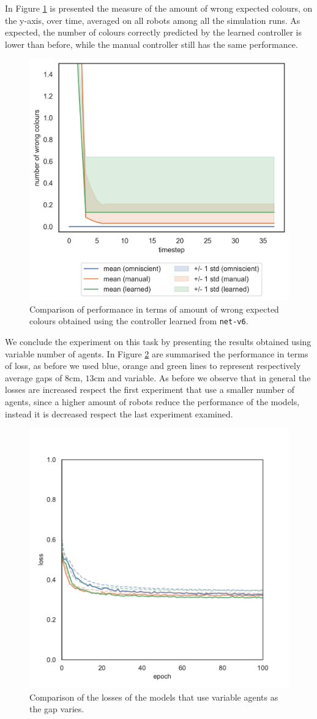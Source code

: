 In Figure \ref{fig:net-v6error} is presented the measure of the amount of wrong 
expected colours, on the y-axis, over time, averaged on all robots among all the 
simulation runs. 
As expected, the number of colours correctly predicted by the learned controller 
is lower than before, while the manual controller still has the same performance.  
\begin{figure}[!htb]
	\centering
	\includegraphics[width=.5\textwidth]{contents/images/net-v6/colours-errors-compressed}%
	\caption[Evaluation of \texttt{net-v6} amount of wrong expected 
	colours.]{Comparison of performance in terms of amount of wrong expected 
		colours obtained using the controller learned from \texttt{net-v6}.}
	\label{fig:net-v6error}
\end{figure}

We conclude the experiment on this task by presenting the results obtained using 
variable number of agents. In Figure \ref{fig:commlossnvart2} are summarised the 
performance in terms of loss, as before we used blue, orange and green lines to 
represent respectively average gaps of $8$\gls{cm}, $13$\gls{cm} and variable. 
As before we observe that in general the losses are increased respect the first 
experiment that use a smaller number of agents, since a higher amount of robots 
reduce the performance of the models, instead it is decreased respect the last 
experiment examined.
\begin{figure}[!htb]
	\centering
	\includegraphics[width=.45\textwidth]{contents/images/task2/loss-communication-Nvar}
	\caption{Comparison of the losses of the models that use variable agents as the 
	gap varies.}
	\label{fig:commlossnvart2}
\end{figure}

